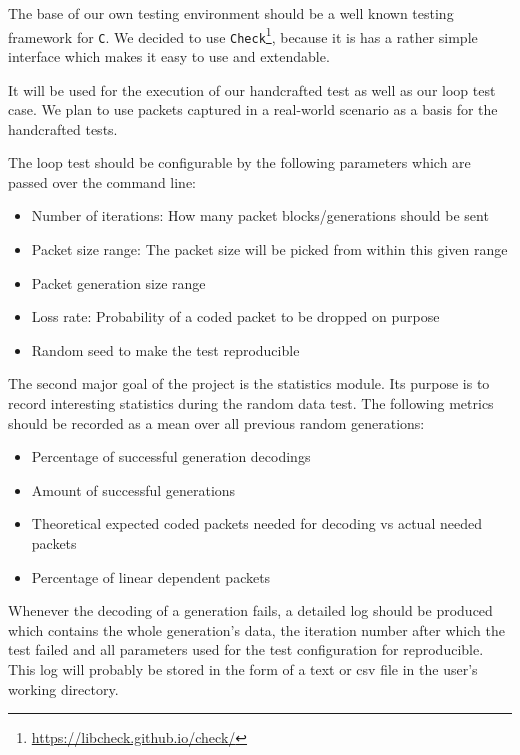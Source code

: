 \documentclass[a4paper,english,10pt,NET]{tumarticle}
\begin{document}
The base of our own testing environment should be a well known testing framework for \texttt{C}. 
We decided to use \texttt{Check}\footnote{\url{https://libcheck.github.io/check/}}, because it is has a rather simple interface which makes it easy to use and extendable.

It will be used for the execution of our handcrafted test as well as our loop test case.
We plan to use packets captured in a real-world scenario as a basis for the handcrafted tests. 

The loop test should be configurable by the following parameters which are passed over the command line:
\begin{itemize}
    \setlength{\itemsep}{1pt}
	\setlength{\parskip}{0pt}
	\setlength{\parsep}{0pt}
    \item Number of iterations: How many packet blocks/generations should be sent
    \item Packet size range: The packet size will be picked from within this given range
    \item Packet generation size range
    \item Loss rate: Probability of a coded packet to be dropped on purpose
    \item Random seed to make the test reproducible
\end{itemize}

The second major goal of the project is the statistics module. Its purpose is to record interesting statistics during the random data test. The following metrics should be recorded as a mean over all previous random generations: %
\begin{itemize}
    \setlength{\itemsep}{1pt}
	\setlength{\parskip}{0pt}
	\setlength{\parsep}{0pt}
    \item Percentage of successful generation decodings
    \item Amount of successful generations
    \item Theoretical expected coded packets needed for decoding vs actual needed packets
    \item Percentage of linear dependent packets
\end{itemize}
Whenever the decoding of a generation fails, a detailed log should be produced which contains the whole generation's data, the iteration number after which the test failed and all parameters used for the test configuration for reproducible. This log will probably be stored in the form of a text or csv file in the user's working directory.
\end{document}
